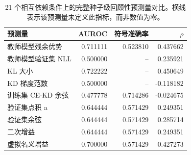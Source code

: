 \begin{table}[!t]\centering
\begin{tabular}{lrrr}
\toprule
预测量 & AUROC & 符号准确率 & $\rho$ \\
\midrule
教师模型残余优势 & 0.711111 & 0.523810 & 0.437662 \\
教师模型验证集 NLL & 0.500000 & -- & 0.235921 \\
KL 大小 & 0.722222 & -- & 0.450649 \\
KD 梯度范数 & 0.500000 & -- & -0.118182 \\
训练集 CE-KD 余弦 & 0.477778 & 0.714286 & -0.024675 \\
验证集点积 a & 0.644444 & 0.571429 & 0.249351 \\
验证集余弦 & 0.644444 & 0.571429 & 0.285714 \\
二次增益 & 0.644444 & 0.571429 & 0.249351 \\
虚拟名义增益 & 0.700000 & 0.571429 & 0.427273 \\
\bottomrule
\end{tabular}
\caption{21 个相互依赖条件上的完整种子级回顾性预测量对比。横线表示该预测量未定义此指标，而非数值为零。}\label{tab:full_predictors}
\end{table}
